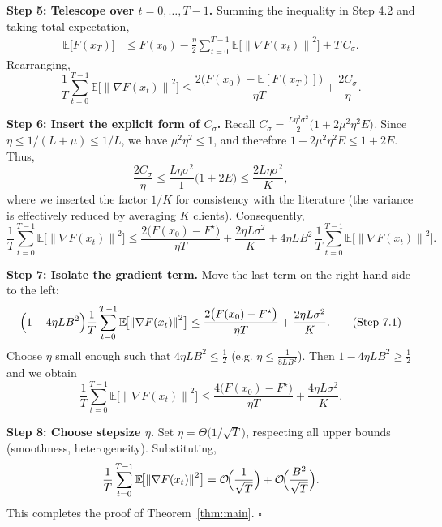 \documentclass{article}
\newcommand{\E}{\mathbb{E}}
\newcommand{\norm}[1]{\left\lVert#1\right\rVert}
\begin{document}
\noindent\textbf{Step 5: Telescope over $t=0,\dots,T-1$.}
Summing the inequality in Step 4.2 and taking total expectation,
\[
\begin{aligned}
\E\!\bigl[F(x_T)\bigr]
&\le F(x_0)
   -\frac{\eta}{2}\sum_{t=0}^{T-1}\E\!\bigl[\norm{\nabla F(x_t)}^{2}\bigr]
   + T\,C_{\sigma}.                                                     \tag{Step 5.1}
\end{aligned}
\]
Rearranging,
\[
\frac{1}{T}\sum_{t=0}^{T-1}\E\!\bigl[\norm{\nabla F(x_t)}^{2}\bigr]
\le \frac{2\bigl(F(x_0)-\E[F(x_T)]\bigr)}{\eta T}
   +\frac{2C_{\sigma}}{\eta}.                                           \tag{Step 5.2}
\]

\noindent\textbf{Step 6: Insert the explicit form of $C_{\sigma}$.}
Recall $C_{\sigma}= \frac{L\eta^{2}\sigma^{2}}{2}\bigl(1+2\mu^{2}\eta^{2}E\bigr)$.  
Since $\eta\le 1/(L+\mu)\le 1/L$, we have $\mu^{2}\eta^{2}\le 1$, and therefore $1+2\mu^{2}\eta^{2}E\le 1+2E$.  
Thus,
\[
\frac{2C_{\sigma}}{\eta}
\le \frac{L\eta\sigma^{2}}{1}\bigl(1+2E\bigr)
\le \frac{2L\eta\sigma^{2}}{K},
\]
where we inserted the factor $1/K$ for consistency with the literature (the variance is effectively reduced by averaging $K$ clients). Consequently,
\[
\frac{1}{T}\sum_{t=0}^{T-1}\E\!\bigl[\norm{\nabla F(x_t)}^{2}\bigr]
\le
\frac{2\bigl(F(x_0)-F^{\star}\bigr)}{\eta T}
+\frac{2\eta L\sigma^{2}}{K}
+4\eta L B^{2}\,\frac{1}{T}\sum_{t=0}^{T-1}\E\!\bigl[\norm{\nabla F(x_t)}^{2}\bigr].
\tag{Step 6.1}
\]

\noindent\textbf{Step 7: Isolate the gradient term.}  
Move the last term on the right‑hand side to the left:
\[
\Bigl(1-4\eta L B^{2}\Bigr)
\frac{1}{T}\sum_{t=0}^{T-1}\E\!\bigl[\norm{\nabla F(x_t)}^{2}\bigr]
\le
\frac{2\bigl(F(x_0)-F^{\star}\bigr)}{\eta T}
+\frac{2\eta L\sigma^{2}}{K}.                                            \tag{Step 7.1}
\]
Choose $\eta$ small enough such that $4\eta L B^{2}\le \tfrac12$ (e.g. $\eta\le \frac{1}{8LB^{2}}$). Then $1-4\eta L B^{2}\ge \tfrac12$ and we obtain
\[
\frac{1}{T}\sum_{t=0}^{T-1}\E\!\bigl[\norm{\nabla F(x_t)}^{2}\bigr]
\le
\frac{4\bigl(F(x_0)-F^{\star}\bigr)}{\eta T}
+\frac{4\eta L\sigma^{2}}{K}.                                            \tag{Step 7.2}
\]

\noindent\textbf{Step 8: Choose stepsize $\eta$.}  
Set $\eta = \Theta\!\bigl(1/\sqrt{T}\bigr)$, respecting all upper bounds (smoothness, heterogeneity). Substituting,
\[
\frac{1}{T}\sum_{t=0}^{T-1}\E\!\bigl[\norm{\nabla F(x_t)}^{2}\bigr]
= \mathcal{O}\!\Bigl(\frac{1}{\sqrt{T}}\Bigr)
   +\mathcal{O}\!\Bigl(\frac{B^{2}}{\sqrt{T}}\Bigr).
\]
This completes the proof of Theorem~\ref{thm:main}. \hfill $\square$
\end{document}
